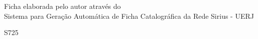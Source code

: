 %
% 


\begin{titlepage}
	\begin{center}
\vfill
\singlespacing
	\vspace*{75mm}
	{Ficha elaborada pelo autor através do\\ \vspace{1.5mm}
	 Sistema para Geração Automática de Ficha Catalográfica da Rede Sirius - UERJ}\\
	\vspace{1.5mm}
	\begin{boxedminipage}{140mm}
	\begin{minipage}{5mm}
		\vspace{-84mm}
		S725
	\end{minipage}
	\hfill
	\raisebox{8.5mm}{
	\begin{minipage}[top]{115mm}
		\vspace*{5mm}


\end{minipage}}
\end{boxedminipage}
\end{center}
\end{titlepage}
